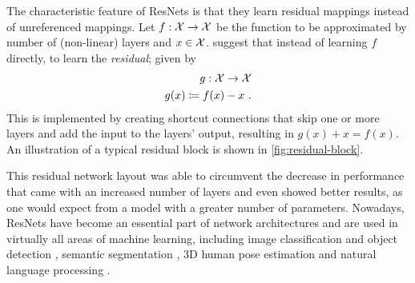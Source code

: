 The characteristic feature of ResNets is that they learn residual mappings instead of unreferenced mappings.
Let $f: \mathcal{X} \rightarrow \mathcal{X}$ be the function to be approximated by number of (non-linear) layers and $x \in \mathcal{X}$.
\citet{he16} suggest that instead of learning $f$ directly, to learn the \emph{residual}; given by
\begin{equation}
	\begin{split}
		g: \mathcal{X} \rightarrow \mathcal{X} \\
		g(x) \coloneqq f(x) - x \ .
	\end{split}
\end{equation}
This is implemented by creating shortcut connections that skip one or more layers and add the input to the layers' output, resulting in $g(x) + x = f(x)$.
An illustration of a typical residual block is shown in \cref{fig:residual-block}.



This residual network layout was able to circumvent the decrease in performance that came with an increased number of layers and even showed better results, as one would expect from a model with a greater number of parameters.
Nowadays, ResNets have become an essential part of network architectures and are used in virtually all areas of machine learning, including image classification and object detection \cite{he16,carion20}, semantic segmentation \cite{chen17}, 3D human pose estimation \cite{drover18} and natural language processing \cite{keskar19,conneau16,vaswani17}.
